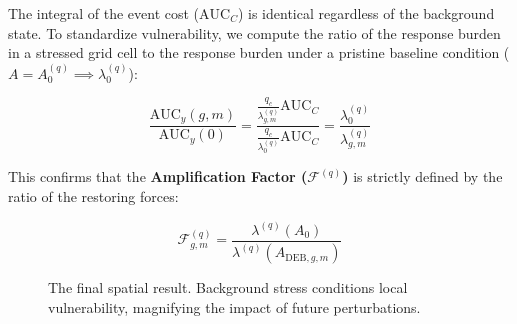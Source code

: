 \documentclass[11pt,a4paper]{article}
\begin{document}
The integral of the event cost ($\text{AUC}_C$) is identical regardless of the background state. To standardize vulnerability, we compute the ratio of the response burden in a stressed grid cell to the response burden under a pristine baseline condition ($A = A_0^{(q)} \implies \lambda_0^{(q)}$):

\begin{equation}
\frac{\text{AUC}_y(g,m)}{\text{AUC}_y(0)} = \frac{\frac{q_c}{\lambda_{g,m}^{(q)}} \text{AUC}_C}{\frac{q_c}{\lambda_0^{(q)}} \text{AUC}_C} = \frac{\lambda_0^{(q)}}{\lambda_{g,m}^{(q)}}
\end{equation}

This confirms that the \textbf{Amplification Factor ($\mathcal{F}^{(q)}$)} is strictly defined by the ratio of the restoring forces:

\begin{equation}
\boxed{ \mathcal{F}_{g,m}^{(q)} = \frac{\lambda^{(q)}(A_0)}{\lambda^{(q)}(A_{\mathrm{DEB},g,m})} }
\end{equation}

\begin{figure}[H]
\centering
{}
\caption{The final spatial result. Background stress conditions local vulnerability, magnifying the impact of future perturbations.}
\end{figure}
\end{document}
